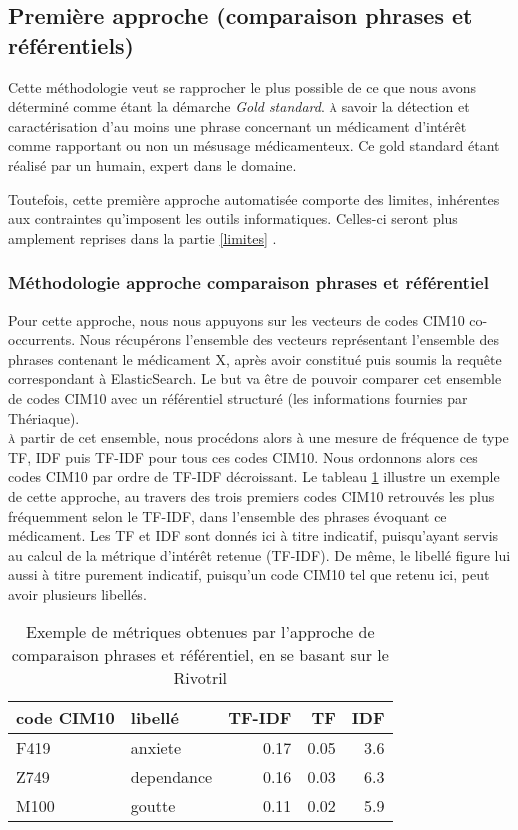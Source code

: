\documentclass[a4paper, 12pt, openany, oneside, abstract=on]{article} %
\begin{document}
\subsection{Première approche (comparaison phrases et référentiels)}
Cette méthodologie veut se rapprocher le plus possible de ce que nous avons déterminé comme étant la démarche \og{}\emph{Gold standard}\fg{}. \textsc{à} savoir la détection et caractérisation d'au moins une phrase concernant un médicament d'intérêt comme rapportant ou non un mésusage médicamenteux. Ce gold standard étant réalisé par un humain, expert dans le domaine.

Toutefois, cette première approche automatisée comporte des limites, inhérentes aux contraintes qu'imposent les outils informatiques. Celles-ci seront plus amplement reprises dans la partie \ref{limites} \pageref{limites}.

\subsubsection{Méthodologie approche comparaison phrases et référentiel}
Pour cette approche, nous nous appuyons sur les vecteurs de codes CIM10 co-occurrents. Nous récupérons l'ensemble des vecteurs représentant l'ensemble des phrases contenant le médicament X, après avoir constitué puis soumis la requête correspondant à ElasticSearch. Le but va être de pouvoir comparer cet ensemble de codes CIM10 avec un référentiel structuré (les informations fournies par Thériaque).\\
\textsc{à} partir de cet ensemble, nous procédons alors à une mesure de fréquence de type TF, IDF puis TF-IDF pour tous ces codes CIM10. Nous ordonnons alors ces codes CIM10 par ordre de TF-IDF décroissant.
Le tableau \ref{table:MsrTFIDF} illustre un exemple de cette approche, au travers des trois premiers codes CIM10 retrouvés les plus fréquemment selon le TF-IDF, dans l'ensemble des phrases évoquant ce médicament. Les TF et IDF sont donnés ici à titre indicatif, puisqu'ayant servis au calcul de la métrique d'intérêt retenue (TF-IDF). De même, le libellé figure lui aussi à titre purement indicatif, puisqu'un code CIM10 tel que retenu ici, peut avoir plusieurs libellés.

\begin{table}[H]
\centering
\begin{tabular}{llrrr}
\hline
code CIM10 & libellé & TF-IDF & TF & IDF \\
\hline
F419 & anxiete & 0.17 & 0.05 & 3.6 \\
Z749 & dependance & 0.16 & 0.03 & 6.3 \\
M100 & goutte & 0.11 & 0.02 & 5.9 \\
\hline
\end{tabular}
\caption{Exemple de métriques obtenues par l'approche de comparaison phrases et référentiel, en se basant sur le Rivotril}
\label{table:MsrTFIDF}
\end{table}
\end{document}
